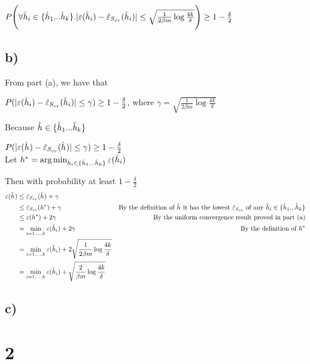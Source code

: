 \documentclass[11pt]{article}
\begin{document}
$P\Bigg(\forall \hat{h}_{i} \in \{\hat{h}_{1}...\hat{h}_{k}\}. |\varepsilon(\hat{h}_{i}) - \hat{\varepsilon}_{S_{cv}}(\hat{h}_{i})| \le \sqrt{\frac{1}{2 \beta m} \log \frac{4k}{\delta}}\Bigg) \geq 1 - \frac{\delta}{2}$

\subsection*{b)}

From part (a), we have that 

$P(|\varepsilon(\hat{h}_{i}) - \hat{\varepsilon}_{S_{cv}}(\hat{h}_{i})| \le \gamma) \geq 1 - \frac{\delta}{2}$, where $\gamma = \sqrt{\frac{1}{2 \beta m} \log \frac{4k}{\delta}}$

Because $\hat{h}_{} \in \{\hat{h}_{1}...\hat{h}_{k}\}$

$P(|\varepsilon(\hat{h}_{}) - \hat{\varepsilon}_{S_{cv}}(\hat{h}_{})| \le \gamma) \geq 1 - \frac{\delta}{2}$ \\

Let $h^* = \arg \min_{\hat{h}_{i} \in \{\hat{h}_{1}...\hat{h}_{k}\}} \varepsilon(\hat{h}_{i})$

Then with probability at least $1 - \frac{\delta}{2}$ \begin{align*}
    \varepsilon(\hat{h}_{}) &\le \hat{\varepsilon}_{S_{cv}}(\hat{h}_{}) + \gamma \\
                     &\le \hat{\varepsilon}_{S_{cv}}(h^*) + \gamma & \text{By the definition of $\hat{h}_{}$ it has the lowest $\hat{\varepsilon}_{S_{cv}}$ of any $\hat{h}_{i} \in \{\hat{h}_{1}...\hat{h}_{k}\}$} \\
                     &\le \varepsilon(h^*) + 2 \gamma & \text{By the uniform convergence result proved in part (a)} \\
                     &= \min_{i=1,...,k} \varepsilon(\hat{h}_{i}) + 2 \gamma & \text{By the definition of $h^*$} \\
                     &= \min_{i=1,...,k} \varepsilon(\hat{h}_{i}) + 2 \sqrt{\frac{1}{2 \beta m} \log \frac{4k}{\delta}} \\
                     &= \min_{i=1,...,k} \varepsilon(\hat{h}_{i}) + \sqrt{\frac{2}{\beta m} \log \frac{4k}{\delta}} \\
\end{align*}

\subsection*{c)}

\section*{2}
\end{document}
